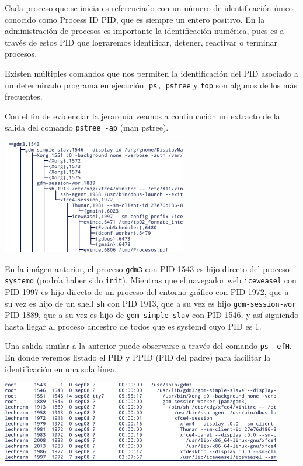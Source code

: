 \documentclass[12pt]{article}
\begin{document}
Cada proceso que se inicia es referenciado con un número de identificación 
único conocido como Process ID PID, que es siempre un entero positivo. En la 
administración de procesos es importante la identificación numérica, pues es
a través de estos PID que lograremos identificar, detener, reactivar o terminar
procesos.  

Existen múltiples comandos que nos permiten la identificación del PID asociado 
a un determinado programa en ejecución: {\tt ps, pstree} y {\tt top} son 
algunos de los más frecuentes. 

Con el fin de evidenciar la jerarquía veamos a continuación un extracto de la 
salida del comando \texttt{pstree -ap} (man pstree). 

\begin{center}
\includegraphics{jerprocs.png}
\end{center}

En la imágen anterior, el proceso {\tt gdm3} con PID 1543 es hijo directo del 
proceso {\tt systemd} (podría haber sido {\tt init}). Mientras que el navegador
web {\tt iceweasel} con PID 1997 es hijo directo de un proceso del entorno 
gráfico con PID 1972, que a su vez es hijo de un shell {\tt sh} con PID 1913, 
que a su vez es hijo {\tt gdm-session-wor} PID 1889, que a su vez es hijo de 
{\tt gdm-simple-slav} con PID 1546, y así siguiendo hasta llegar al proceso 
ancestro de todos que es systemd cuyo PID es 1. 

Una salida similar a la anterior puede observarse a través del comando
{\tt ps -efH}. En donde veremos listado el PID y PPID (PID del padre) para 
facilitar la identificación en una sola línea. 

\begin{center}
\includegraphics{psejHs.png}
\end{center}
\end{document}
